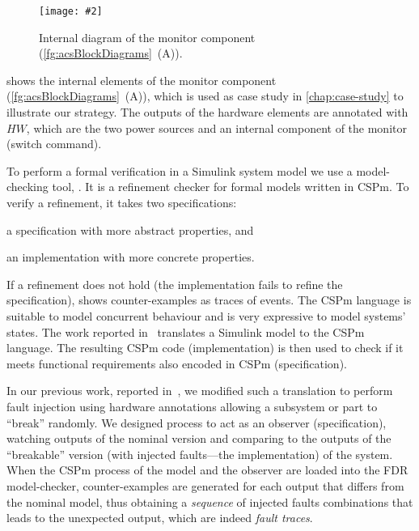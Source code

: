 \documentclass[12pt,openright,twoside,a4paper,oldfontcommands,english,brazil,final]{abntex2}
\theoremstyle{theo}
\newcommand{\includegraphicsaspectratio}[2][1]{%
  \texttt{[image: \#2]}%
}
\newcommand{\textsim}[1]{$#1$}
\newcommand{\simulink}{Simulink\xspace}
\begin{document}
\begin{figure}[htb]
  \centering
  \includegraphicsaspectratio[0.6]{blockDiagramMonitorInternals}
  \caption{Internal diagram of the monitor component (\cref{fg:acsBlockDiagrams}~(A)).}
  \label{fg:blockDiagramMonitorInternals}
\end{figure}

 shows the internal elements of the monitor component (\cref{fg:acsBlockDiagrams}~(A)), which is used as case study in \cref{chap:case-study} to illustrate our
strategy.
The outputs of the hardware elements are annotated with \textsim{HW}, which are the two power sources and an internal component of the monitor (switch command).


To perform a formal verification in a \simulink system model we use a model-checking tool, .
It is a refinement checker for formal models written in \ac{CSPm}.
To verify a refinement, it takes two specifications:
\begin{alineasinline}
  \item a specification with more abstract properties, and
  \item an implementation with more concrete properties.
\end{alineasinline}
If a refinement does not hold (the implementation fails to refine the specification),  shows counter-examples as traces of events.
The \ac{CSPm} language is suitable to model concurrent behaviour and is very expressive to model systems' states.
The work reported in~\cite{JMS+2011} translates a \simulink model to the \ac{CSPm} language.
%
The resulting \ac{CSPm} code (implementation) is then used to check if it meets functional requirements also encoded in \ac{CSPm} (specification).

In our previous work, reported in~\cite{DM2012}, we modified such a translation to perform fault injection using hardware annotations allowing a subsystem or part to ``break'' randomly.
%
We designed  process to act as an observer (specification), watching outputs of the nominal version and comparing to the outputs of the ``breakable'' version (with injected faults---the implementation) of the system.
%
When the \ac{CSPm} process of the model and the observer are loaded into the \acs{FDR} model-checker, counter-examples are generated for each output that differs from the nominal model, thus obtaining a \emph{sequence} of injected faults combinations that leads to the unexpected output, which are indeed \emph{fault traces}.
\end{document}
